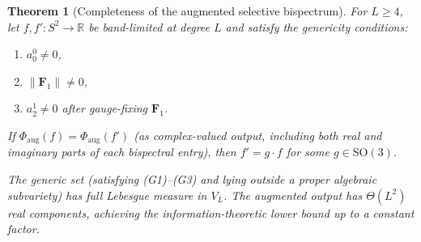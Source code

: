 \documentclass[11pt]{article}
\newtheorem{theorem}{Theorem}
\newcommand{\R}{\mathbb{R}}
\newcommand{\SO}{\mathrm{SO}}
\newcommand{\norm}[1]{\lVert #1 \rVert}
\begin{document}
\begin{theorem}[Completeness of the augmented selective bispectrum]
\label{thm:main}
For $L \ge 4$, let $f, f': S^2 \to \R$ be band-limited at degree $L$
and satisfy the genericity conditions:
\begin{enumerate}[nosep,label=(G\arabic*)]
\item $a_0^0 \ne 0$,
\item $\norm{\mathbf{F}_1} \ne 0$,
\item $a_2^1 \ne 0$ after gauge-fixing $\mathbf{F}_1$.
\end{enumerate}
If $\Phi_{\mathrm{aug}}(f) = \Phi_{\mathrm{aug}}(f')$
(as complex-valued output, including both real and imaginary parts
of each bispectral entry), then $f' = g \cdot f$ for some $g \in \SO(3)$.

The generic set (satisfying (G1)--(G3) and lying outside a proper
algebraic subvariety) has full Lebesgue measure in $V_L$.
The augmented output has $\Theta(L^2)$ real components, achieving the
information-theoretic lower bound up to a constant factor.
\end{theorem}
\end{document}
